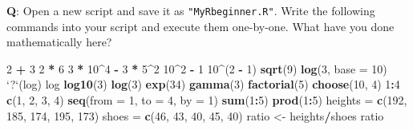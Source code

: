 \documentclass[]{article}
\newenvironment{Shaded}{\begin{snugshade}}{\end{snugshade}}
\newcommand{\KeywordTok}[1]{\textcolor[rgb]{0.13,0.29,0.53}{\textbf{#1}}}
\newcommand{\DataTypeTok}[1]{\textcolor[rgb]{0.13,0.29,0.53}{#1}}
\newcommand{\DecValTok}[1]{\textcolor[rgb]{0.00,0.00,0.81}{#1}}
\newcommand{\StringTok}[1]{\textcolor[rgb]{0.31,0.60,0.02}{#1}}
\newcommand{\OperatorTok}[1]{\textcolor[rgb]{0.81,0.36,0.00}{\textbf{#1}}}
\newcommand{\NormalTok}[1]{#1}
\begin{document}
\textbf{Q}: Open a new script and save it as \texttt{"MyRbeginner.R"}.
Write the following commands into your script and execute them
one-by-one. What have you done mathematically here?

\begin{Shaded}
\begin{Highlighting}[]
\DecValTok{2} \OperatorTok{+}\StringTok{ }\DecValTok{3}
\DecValTok{2} \OperatorTok{*}\StringTok{ }\DecValTok{6}
\DecValTok{3} \OperatorTok{*}\StringTok{ }\DecValTok{10}\OperatorTok{^}\DecValTok{4} \OperatorTok{-}\StringTok{ }\DecValTok{3} \OperatorTok{*}\StringTok{ }\DecValTok{5}\OperatorTok{^}\DecValTok{2}
\DecValTok{10}\OperatorTok{^}\DecValTok{2} \OperatorTok{-}\StringTok{ }\DecValTok{1}
\DecValTok{10}\OperatorTok{^}\NormalTok{(}\DecValTok{2} \OperatorTok{-}\StringTok{ }\DecValTok{1}\NormalTok{)}
\KeywordTok{sqrt}\NormalTok{(}\DecValTok{9}\NormalTok{)}
\KeywordTok{log}\NormalTok{(}\DecValTok{3}\NormalTok{, }\DataTypeTok{base =} \DecValTok{10}\NormalTok{)}
\StringTok{`}\DataTypeTok{?}\StringTok{`}\NormalTok{(log)}
\NormalTok{log}
\KeywordTok{log10}\NormalTok{(}\DecValTok{3}\NormalTok{)}
\KeywordTok{log}\NormalTok{(}\DecValTok{3}\NormalTok{)}
\KeywordTok{exp}\NormalTok{(}\DecValTok{34}\NormalTok{)}
\KeywordTok{gamma}\NormalTok{(}\DecValTok{3}\NormalTok{)}
\KeywordTok{factorial}\NormalTok{(}\DecValTok{5}\NormalTok{)}
\KeywordTok{choose}\NormalTok{(}\DecValTok{10}\NormalTok{, }\DecValTok{4}\NormalTok{)}
\DecValTok{1}\OperatorTok{:}\DecValTok{4}
\KeywordTok{c}\NormalTok{(}\DecValTok{1}\NormalTok{, }\DecValTok{2}\NormalTok{, }\DecValTok{3}\NormalTok{, }\DecValTok{4}\NormalTok{)}
\KeywordTok{seq}\NormalTok{(}\DataTypeTok{from =} \DecValTok{1}\NormalTok{, }\DataTypeTok{to =} \DecValTok{4}\NormalTok{, }\DataTypeTok{by =} \DecValTok{1}\NormalTok{)}
\KeywordTok{sum}\NormalTok{(}\DecValTok{1}\OperatorTok{:}\DecValTok{5}\NormalTok{)}
\KeywordTok{prod}\NormalTok{(}\DecValTok{1}\OperatorTok{:}\DecValTok{5}\NormalTok{)}
\NormalTok{heights =}\StringTok{ }\KeywordTok{c}\NormalTok{(}\DecValTok{192}\NormalTok{, }\DecValTok{185}\NormalTok{, }\DecValTok{174}\NormalTok{, }\DecValTok{195}\NormalTok{, }\DecValTok{173}\NormalTok{)}
\NormalTok{shoes =}\StringTok{ }\KeywordTok{c}\NormalTok{(}\DecValTok{46}\NormalTok{, }\DecValTok{43}\NormalTok{, }\DecValTok{40}\NormalTok{, }\DecValTok{45}\NormalTok{, }\DecValTok{40}\NormalTok{)}
\NormalTok{ratio <-}\StringTok{ }\NormalTok{heights}\OperatorTok{/}\NormalTok{shoes}
\NormalTok{ratio}
\end{Highlighting}
\end{Shaded}
\end{document}
